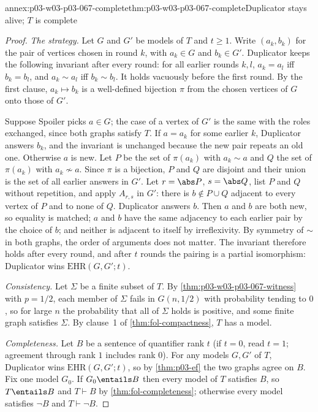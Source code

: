 \begin{annexitem}{annex:p03-w03-p03-067-complete}{thm:p03-w03-p03-067-complete}{Duplicator stays alive; \(T\) is complete}
\begin{proof}
\emph{The strategy.}  Let \(G\) and \(G'\) be models of \(T\) and \(t\geq1\).
Write \((a_k,b_k)\) for the pair of vertices chosen in round \(k\), with
\(a_k\in G\) and \(b_k\in G'\).  Duplicator keeps the following invariant
after every round: for all earlier rounds \(k,l\), \(a_k=a_l\) iff
\(b_k=b_l\), and \(a_k\sim a_l\) iff \(b_k\sim b_l\).  It holds vacuously
before the first round.  By the first clause, \(a_k\mapsto b_k\) is a
well-defined bijection \(\pi\) from the chosen vertices of \(G\) onto those of
\(G'\).

Suppose Spoiler picks \(a\in G\); the case of a vertex of \(G'\) is the same
with the roles exchanged, since both graphs satisfy \(T\).  If \(a=a_k\) for
some earlier \(k\), Duplicator answers \(b_k\), and the invariant is
unchanged because the new pair repeats an old one.  Otherwise \(a\) is new.
Let \(P\) be the set of \(\pi(a_k)\) with \(a_k\sim a\) and \(Q\) the set of
\(\pi(a_k)\) with \(a_k\not\sim a\).  Since \(\pi\) is a bijection, \(P\) and
\(Q\) are disjoint and their union is the set of all earlier answers in
\(G'\).  Let \(r=\abs P\), \(s=\abs Q\), list \(P\) and \(Q\) without
repetition, and apply \(A_{r,s}\) in \(G'\): there is \(b\notin P\cup Q\)
adjacent to every vertex of \(P\) and to none of \(Q\).  Duplicator answers
\(b\).  Then \(a\) and \(b\) are both new, so equality is matched; \(a\) and
\(b\) have the same adjacency to each earlier pair by the choice of \(b\); and
neither is adjacent to itself by irreflexivity.  By symmetry of \(\sim\) in
both graphs, the order of arguments does not matter.  The invariant
therefore holds after every round, and after \(t\) rounds the pairing is a
partial isomorphism: Duplicator wins \(\mathrm{EHR}(G,G';t)\).

\emph{Consistency.}  Let \(\Sigma\) be a finite subset of \(T\).  By
\cref{thm:p03-w03-p03-067-witness} with \(p=1/2\), each member of \(\Sigma\)
fails in \(G(n,1/2)\) with probability tending to \(0\), so for large \(n\)
the probability that all of \(\Sigma\) holds is positive, and some finite
graph satisfies \(\Sigma\).  By clause~1 of \cref{thm:fol-compactness},
\(T\) has a model.

\emph{Completeness.}  Let \(B\) be a sentence of quantifier rank \(t\) (if
\(t=0\), read \(t=1\); agreement through rank \(1\) includes rank \(0\)).  For
any models \(G,G'\) of \(T\), Duplicator wins \(\mathrm{EHR}(G,G';t)\), so by
\cref{thm:p03-ef} the two graphs agree on \(B\).  Fix one model \(G_0\).  If
\(G_0\entails B\) then every model of \(T\) satisfies \(B\), so
\(T\entails B\) and \(T\vdash B\) by \cref{thm:fol-completeness}; otherwise
every model satisfies \(\neg B\) and \(T\vdash\neg B\).
\end{proof}
\end{annexitem}

